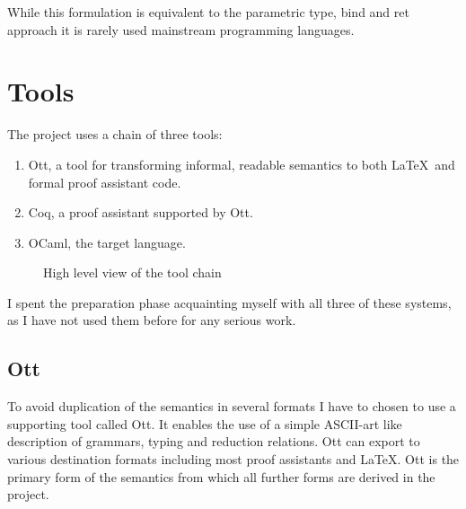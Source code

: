 \documentclass[12pt,twoside,notitlepage]{report}
\theoremstyle{plain}%
\theoremstyle{definition}
\theoremstyle{remark}
\begin{document}
While this formulation is equivalent to the parametric type, bind and ret approach it is rarely used mainstream programming languages.

\section{Tools}
The project uses a chain of three tools: \begin{enumerate}
\item{
Ott, a tool for transforming informal, readable semantics to both \LaTeX\, and formal proof assistant code.}
\item{Coq, a proof assistant supported by Ott. }
\item{OCaml, the target language. }
\end{enumerate}



\begin{figure}[h!]
\centering

\caption{High level view of the tool chain}
\end{figure}


I spent the preparation phase acquainting myself with all three of these systems, as I have not used them before for any serious work.
\subsection{Ott}
To avoid duplication of the semantics in several formats I have to chosen to use a supporting tool called Ott\cite{Ott}. It enables the use of a simple ASCII-art like description of grammars, typing and reduction relations. Ott can export to various destination formats including most proof assistants and \LaTeX. Ott  is the primary form of the semantics from which all further forms are derived in the project.
\end{document}

